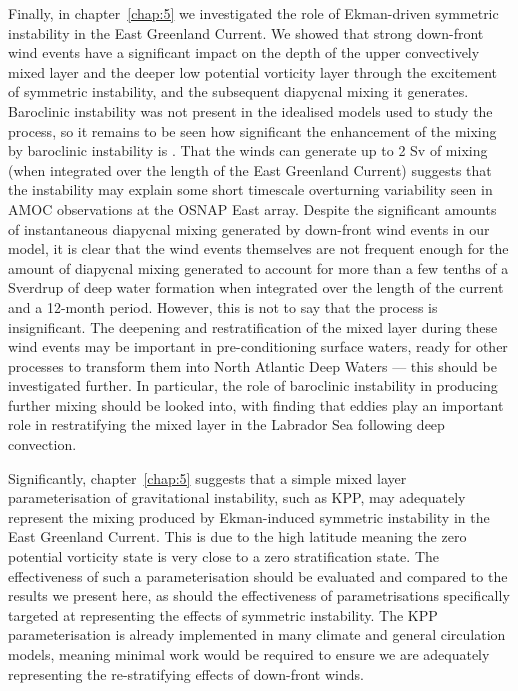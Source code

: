Finally, in chapter~\ref{chap:5} we investigated the role of Ekman-driven symmetric instability in the East Greenland Current. We showed that strong down-front wind events have a significant impact on the depth of the upper convectively mixed layer and the deeper low potential vorticity layer through the excitement of symmetric instability, and the subsequent diapycnal mixing it generates. Baroclinic instability was not present in the idealised models used to study the process, so it remains to be seen how significant the enhancement of the mixing by baroclinic instability is \citep{Spall2016}. That the winds can generate up to 2 Sv of mixing (when integrated over the length of the East Greenland Current) suggests that the instability may explain some short timescale overturning variability seen in AMOC observations at the OSNAP East array. Despite the significant amounts of instantaneous diapycnal mixing generated by down-front wind events in our model, it is clear that the wind events themselves are not frequent enough for the amount of diapycnal mixing generated to account for more than a few tenths of a Sverdrup of deep water formation when integrated over the length of the current and a 12-month period. However, this is not to say that the process is insignificant. The deepening and restratification of the mixed layer during these wind events may be important in pre-conditioning surface waters, ready for other processes to transform them into North Atlantic Deep Waters --- this should be investigated further. In particular, the role of baroclinic instability in producing further mixing should be looked into, with \citet{Gelderloos2011} finding that eddies play an important role in restratifying the mixed layer in the Labrador Sea following deep convection.

Significantly, chapter~\ref{chap:5} suggests that a simple mixed layer parameterisation of gravitational instability, such as KPP, may adequately represent the mixing produced by Ekman-induced symmetric instability in the East Greenland Current.
This is due to the high latitude meaning the zero potential vorticity state is very close to a zero stratification state. The effectiveness of such a parameterisation should be evaluated and compared to the results we present here, as should the effectiveness of parametrisations specifically targeted at representing the effects of symmetric instability.
The KPP parameterisation is already implemented in many climate and general circulation models, meaning minimal work would be required to ensure we are adequately representing the re-stratifying effects of down-front winds.

